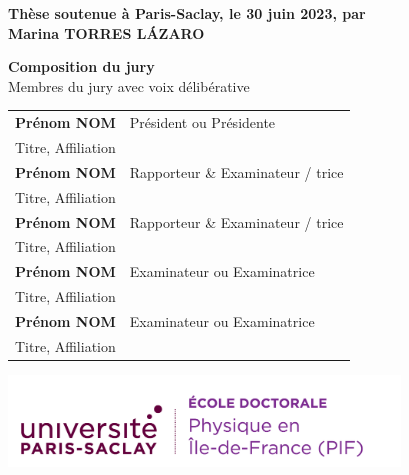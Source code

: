 \documentclass[french,12pt,a4paper]{book}
\begin{document}
\begin{titlepage}
\textbf{Thèse soutenue à Paris-Saclay, le 30 juin 2023, par}\\
\bigskip
\Large {\color{Prune} \textbf{Marina TORRES LÁZARO}} %

\vspace{\fill} %

\bigskip

\flushleft
\small {\color{Prune} \textbf{Composition du jury}}\\
{\color{Prune} \scriptsize {Membres du jury avec voix délibérative}} \\
\vspace{2mm}
\scriptsize
\begin{tabular}{|p{7cm}l}
\arrayrulecolor{Prune}
\textbf{Prénom NOM} &   Président ou Présidente\\ 
Titre, Affiliation & \\
\textbf{Prénom NOM} &  Rapporteur \& Examinateur / trice \\ 
Titre, Affiliation   &   \\ 
\textbf{Prénom NOM} &  Rapporteur \& Examinateur / trice \\ 
Titre, Affiliation  &   \\ 
\textbf{Prénom NOM} &  Examinateur ou Examinatrice \\ 
Titre, Affiliation   &   \\ 
\textbf{Prénom NOM} &  Examinateur ou Examinatrice \\ 
Titre, Affiliation   &   \\ 
 

\end{tabular} 

\end{titlepage}


\thispagestyle{empty}
\selectfont

\lhead{}
\rhead{}
\rfoot{}
\cfoot{}
\lfoot{}

\noindent 
\includegraphics[height=2.45cm]{logo_usp_PIF.png}
\vspace{1cm}
\selectfont
\end{document}
